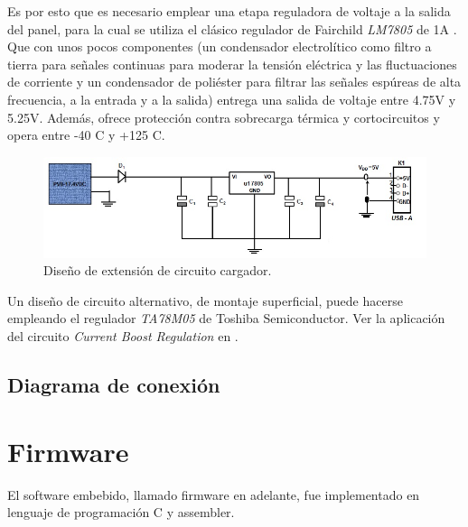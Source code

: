 {Es por esto que es necesario emplear una etapa reguladora de voltaje a la salida del panel, para la cual se utiliza el clásico regulador de Fairchild \textit{LM7805} de 1A \citep{7805}. Que con unos pocos componentes (un condensador electrolítico como filtro a tierra para señales continuas para moderar la tensión eléctrica y las fluctuaciones de corriente y un condensador de poliéster para filtrar las señales espúreas de alta frecuencia, a la entrada y a la salida) entrega una salida de voltaje entre 4.75V y 5.25V. Además, ofrece protección contra sobrecarga térmica y cortocircuitos y opera entre -40 \grados C y +125 \grados C.

\begin{figure}[h!]
	\centering
    \includegraphics[width=1\textwidth]{./Figures/circuito.jpg}
    	\caption{Diseño de extensión de circuito cargador.}
	\label{fig:circuito}
\end{figure}

Un diseño de circuito alternativo, de montaje superficial, puede hacerse empleando el regulador \textit{TA78M05} de Toshiba Semiconductor. Ver la aplicación del circuito \textit{Current Boost Regulation} en \citep{78M05}.


\subsection{Diagrama de conexión}
\label{subsec:conexión}


\section{Firmware}
\label{sec:firm}
El software embebido, llamado firmware en adelante, fue implementado en lenguaje de programación C y assembler.

}
